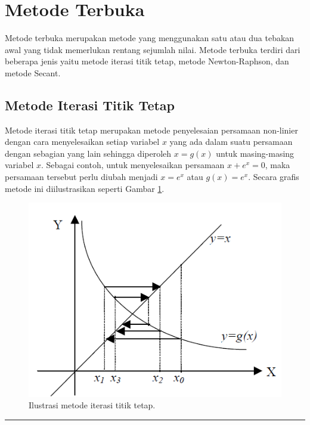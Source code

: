 \documentclass[
]{book}
\theoremstyle{definition}
\theoremstyle{definition}
\theoremstyle{definition}
\theoremstyle{definition}
\theoremstyle{remark}
\begin{document}
\hypertarget{openmethod}{%
\section{Metode Terbuka}\label{openmethod}}

Metode terbuka merupakan metode yang menggunakan satu atau dua tebakan awal yang tidak memerlukan rentang sejumlah nilai. Metode terbuka terdiri dari beberapa jenis yaitu metode iterasi titik tetap, metode Newton-Raphson, dan metode Secant.

\hypertarget{fixpoint}{%
\subsection{Metode Iterasi Titik Tetap}\label{fixpoint}}

Metode iterasi titik tetap merupakan metode penyelesaian persamaan non-linier dengan cara menyelesaikan setiap variabel \(x\) yang ada dalam suatu persamaan dengan sebagian yang lain sehingga diperoleh \(x=g\left(x \right)\) untuk masing-masing variabel \(x\). Sebagai contoh, untuk menyelesaikan persamaan \(x+e^{x}=0\), maka persamaan tersebut perlu diubah menjadi \(x=e^x\) atau \(g\left(x \right)=e^x\). Secara grafis metode ini diilustrasikan seperti Gambar \ref{fig:fixpointiter}.

\begin{figure}

{\centering \includegraphics[width=0.8\linewidth]{./images/fixpointiter} 

}

\caption{Ilustrasi metode iterasi titik tetap.}\label{fig:fixpointiter}
\end{figure}

\begin{center}\rule{0.5\linewidth}{0.5pt}\end{center}
\end{document}

